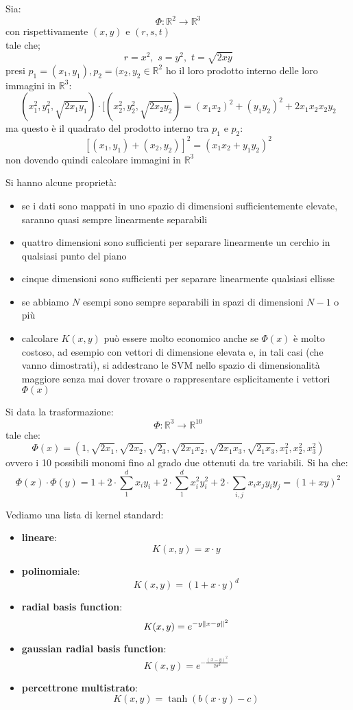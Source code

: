 \begin{esempio}
  Sia:
  \[\Phi:\mathbb{R}^2\to \mathbb{R}^3\]
  con rispettivamente $(x,y)$ e $(r,s,t)$\\
  tale che;
  \[r=x^2,\,\,s=y^2,\,\,t=\sqrt{2xy}\]
  presi $p_1=(x_1,y_1),p_2=(x_2,y_2\in\mathbb{R}^2$ ho il loro prodotto interno
  delle loro immagini in $\mathbb{R}^3$:
  \[(x_1^2,y_1^2,\sqrt{2x_1y_1})\cdot
    [(x_2^2,y_2^2,\sqrt{2x_2y_2})=(x_1x_2)^2+(y_1y_2)^2+2x_1x_2x_2y_2\]
  ma questo è il quadrato del prodotto interno tra $p_1$ e $p_2$:
  \[[(x_1,y_1)+(x_2,y_2)]^2=(x_1x_2+y_1y_2)^2\]
  non dovendo quindi calcolare immagini in $\mathbb{R}^3$
\end{esempio}
Si hanno alcune proprietà:
\begin{itemize}
  \item se i dati sono mappati in uno spazio di dimensioni sufficientemente
  elevate, saranno quasi sempre linearmente separabili
  \item quattro dimensioni sono sufficienti per separare linearmente un cerchio
  in qualsiasi punto del piano
  \item cinque dimensioni sono sufficienti per separare linearmente qualsiasi
  ellisse
  \item se abbiamo $N$ esempi sono sempre separabili in spazi di dimensioni
  $N-1$ o più
  \item calcolare $K(x,y)$ può essere molto economico anche se $\Phi(x)$ è molto
  costoso, ad esempio con vettori di dimensione elevata e, in tali casi (che
  vanno dimostrati), si
  addestrano le SVM nello spazio di dimensionalità maggiore senza mai dover
  trovare o rappresentare esplicitamente i vettori $\Phi(x)$
\end{itemize}
\begin{esempio}
  Si data la trasformazione:
  \[\Phi:\mathbb{R}^3\to \mathbb{R}^{10}\]
  tale che:
  \[\Phi(x)=(1,
    \sqrt{2x_1},\sqrt{2x_2},\sqrt{2_3},\sqrt{2x_1x_2},\sqrt{2x_1x_3},
    \sqrt{2_1x_3},x_1^2,x_2^2,x_3^2)\]
  ovvero i 10 possibili monomi fino al grado due ottenuti da tre variabili. Si
  ha che:
  \[\Phi(x)\cdot\Phi(y)=1+2\cdot\sum_1^dx_iy_i+2\cdot\sum_1^dx_i^2y_i^2+2\cdot\sum_{i,j}
    x_ix_jy_iy_j=(1+xy)^2\]
  
\end{esempio}
Vediamo una lista di kernel standard:
\begin{itemize}
  \item \textbf{lineare}:
  \[K(x,y)=x\cdot y\]
  \item \textbf{polinomiale}:
  \[K(x,y)=(1+x\cdot y)^d\]
  \item \textbf{radial basis function}:
  \[K(x,y)=e^{-y\norm{x-y}^2}\]
  \item \textbf{gaussian radial basis function}:
  \[K(x,y)=e^{-\frac{(x-y)^2}{2\sigma^2}}\]
  \item \textbf{percettrone multistrato}:
  \[K(x,y)=\tanh (b(x\cdot y) -c)\]
\end{itemize}
